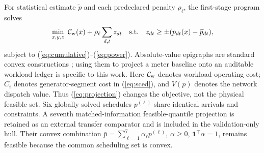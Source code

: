 \documentclass[10pt,journal]{IEEEtran}
\begin{document}
For statistical estimate $\widetilde p$ and each predeclared penalty $\rho_\ell$,
the first-stage program solves
\begin{equation}
 \min_{x,y,z}\ \mathcal C_{\rm w}(x)+\rho_\ell\sum_{d,t}z_{dt}
 \quad {\rm s.t.}\quad
 z_{dt}\geq\pm(p_{dt}(x)-\widetilde p_{dt}),
 \label{eq:projection}
\end{equation}
subject to (\ref{eq:cumulative})--(\ref{eq:power}). Absolute-value epigraphs
are standard convex constructions \cite{boyd2004convex}; using them to project
a meter baseline onto an auditable workload ledger is specific to this work.
Here $\mathcal C_{\rm w}$ denotes workload operating cost; $C_i$ denotes
generator-segment cost in (\ref{eq:sced}), and $V(p)$ denotes the network
dispatch value. Thus (\ref{eq:projection}) changes the objective, not the
physical feasible set.
Six globally solved schedules $p^{(\ell)}$ share identical arrivals and
constraints. A seventh matched-information feasible-quantile projection is
retained as an external transfer comparator and is included in the
validation-only hull. Their convex combination
$\bar p=\sum_{\ell=1}^{7}\alpha_\ell p^{(\ell)}$, $\alpha\geq0$,
$\mathbf1^\top\alpha=1$, remains feasible because the common scheduling set is
convex.
\end{document}
